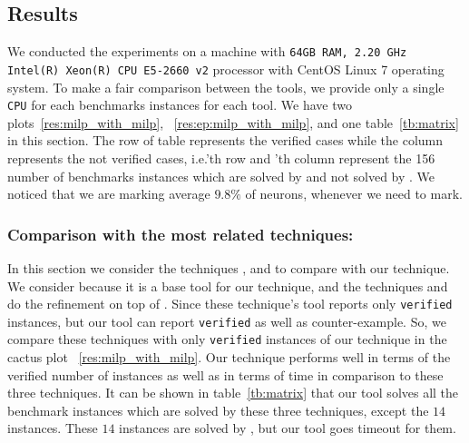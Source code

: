 \subsection{Results}
We conducted the experiments on a machine with \texttt{64GB RAM, 2.20 GHz Intel(R) Xeon(R) CPU E5-2660 v2}
processor with CentOS Linux 7 operating system. 
To make a fair comparison between the tools, we provide only a single \texttt{CPU} for each benchmarks instances for each tool. 
We have two plots~\ref{res:milp_with_milp}, ~\ref{res:ep:milp_with_milp}, and one
table~\ref{tb:matrix} in this section. The row of table represents the verified cases while the column
represents the not verified cases, i.e.\kpoly{}'th row and \deeppoly{}'th column represent the 
156 number of benchmarks instances which are solved by \kpoly{} and not solved by \deeppoly{}. 
We noticed that we are marking average $9.8\%$ of neurons, whenever we need to mark.     

\subsubsection{Comparison with the most related techniques:}
In this section we consider the techniques \deeppoly{}, \kpoly{} and \deepsrgr{} to compare with
our technique. 
We consider \deeppoly{} because it is a base tool for our technique,  
and the techniques \kpoly{} and \deepsrgr{} do the refinement on top of \deeppoly{}.
Since these technique's tool reports only \texttt{verified} instances, but our tool can report 
\texttt{verified} as well as counter-example.  
So, we compare these techniques with only \texttt{verified} 
instances of our technique in the cactus plot ~\ref{res:milp_with_milp}. 
Our technique performs well in terms of the verified number of instances as well as in terms 
of time in comparison to these three techniques. 
It can be shown in table~\ref{tb:matrix} that our tool solves all the benchmark instances 
which are solved by these three techniques, except 
the $14$ instances. These $14$ instances are solved by \kpoly{}, but our tool goes timeout for them. 



